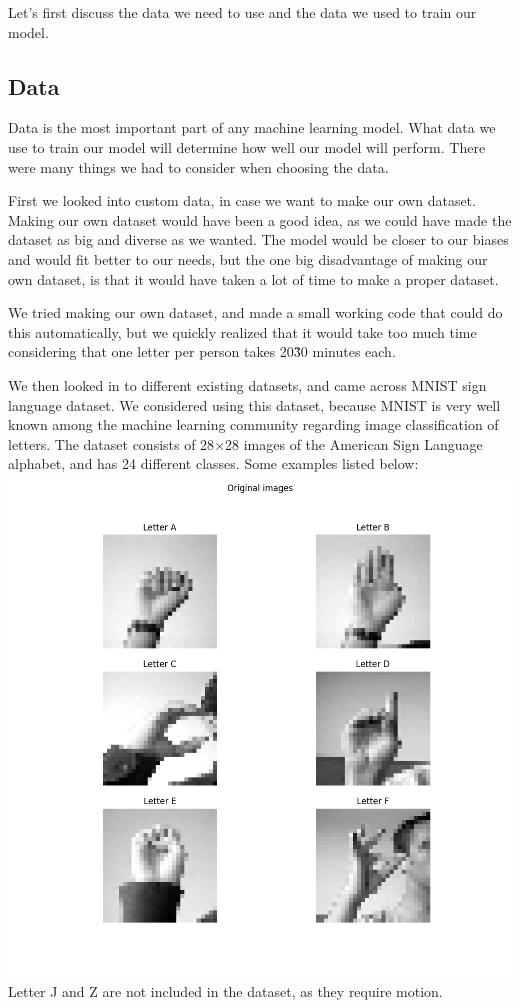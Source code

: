 \documentclass[../paper.tex]{subfiles}
\begin{document}
    Let's first discuss the data we need to use and the data we used to train our model.
    \subsection{Data}
    Data is the most important part of any machine learning model.
    What data we use to train our model will determine how well our model will perform. 
    There were many things we had to consider when choosing the data. 

    First we looked into custom data, in case we want to make our own dataset. 
    Making our own dataset would have been a good idea, 
    as we could have made the dataset as big and diverse as we wanted.
    The model would be closer to our biases and would fit better to our needs, 
    but the one big disadvantage of making our own dataset, is that it would have taken a lot of time to make a proper dataset. 

    We tried making our own dataset, and made a small working code that could do this automatically, 
    but we quickly realized that it would take too much time considering that one letter per person takes 20\~30 minutes each. 

    We then looked in to different existing datasets, and came across MNIST sign language dataset\cite{d0}. 
    We considered using this dataset, because MNIST is very well known among the machine learning community regarding image classification of letters\cite{o0}.
    The dataset consists of 28$\times$28 images of the American Sign Language alphabet, 
    and has 24 different classes. 
    Some examples listed below:
    \includegraphics[width=\linewidth]{letters_grid_6} 
    Letter J and Z are not included in the dataset, as they require motion. 
\end{document}
